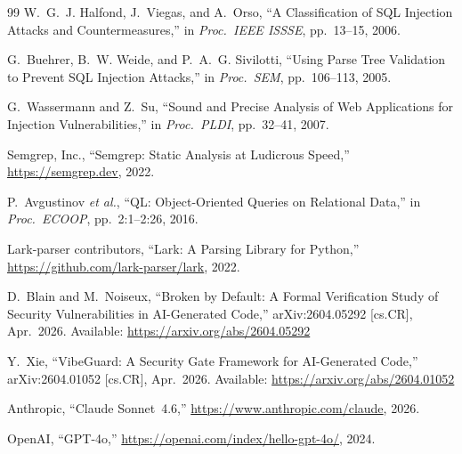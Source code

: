\documentclass[conference,compsoc]{IEEEtran}
\begin{document}
\begin{thebibliography}{99}
W.~G.~J. Halfond, J.~Viegas, and A.~Orso,
``{A Classification of SQL Injection Attacks and Countermeasures},''
in \textit{Proc.\ IEEE ISSSE}, pp.~13--15, 2006.

G.~Buehrer, B.~W. Weide, and P.~A.~G. Sivilotti,
``{Using Parse Tree Validation to Prevent SQL Injection Attacks},''
in \textit{Proc.\ SEM}, pp.~106--113, 2005.

G.~Wassermann and Z.~Su,
``{Sound and Precise Analysis of Web Applications for Injection
Vulnerabilities},''
in \textit{Proc.\ PLDI}, pp.~32--41, 2007.

{Semgrep, Inc.},
``{Semgrep: Static Analysis at Ludicrous Speed},''
\url{https://semgrep.dev}, 2022.

P.~Avgustinov \textit{et al.},
``{QL: Object-Oriented Queries on Relational Data},''
in \textit{Proc.\ ECOOP}, pp.~2:1--2:26, 2016.

{Lark-parser contributors},
``{Lark: A Parsing Library for Python},''
\url{https://github.com/lark-parser/lark}, 2022.

D.~Blain and M.~Noiseux,
``{Broken by Default: A Formal Verification Study of Security
Vulnerabilities in AI-Generated Code},''
arXiv:2604.05292 [cs.CR], Apr.\ 2026.
Available: \url{https://arxiv.org/abs/2604.05292}

Y.~Xie,
``{VibeGuard: A Security Gate Framework for AI-Generated Code},''
arXiv:2604.01052 [cs.CR], Apr.\ 2026.
Available: \url{https://arxiv.org/abs/2604.01052}

{Anthropic},
``{Claude Sonnet~4.6},''
\url{https://www.anthropic.com/claude}, 2026.

{OpenAI},
``{GPT-4o},''
\url{https://openai.com/index/hello-gpt-4o/}, 2024.

\end{thebibliography}
\end{document}

